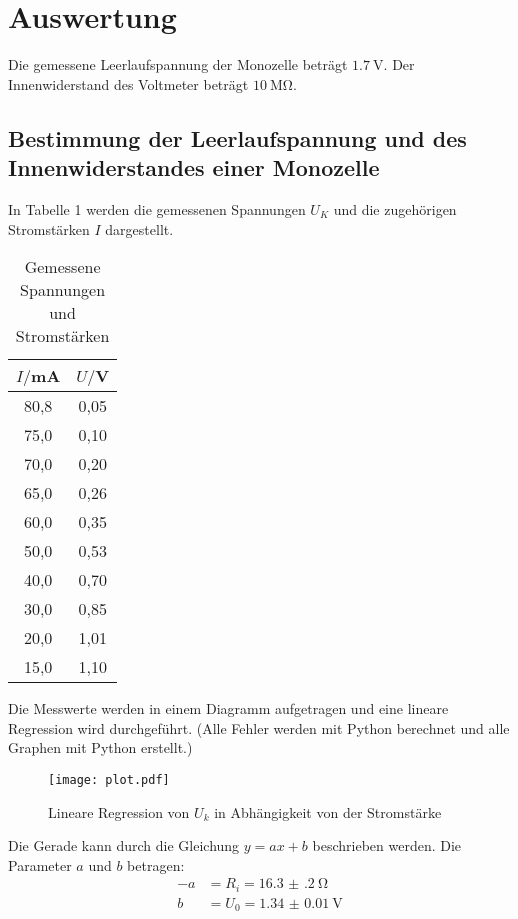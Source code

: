 \section{Auswertung}
\label{sec:Auswertung}

Die gemessene Leerlaufspannung der Monozelle beträgt $\SI{1.7}{\volt}$. Der Innenwiderstand des Voltmeter beträgt $\SI{10}{\mega\ohm}$.

\subsection{Bestimmung der Leerlaufspannung und des Innenwiderstandes einer Monozelle}

In Tabelle 1 werden die gemessenen Spannungen $U_K$ und die zugehörigen Stromstärken $I$ dargestellt.

\begin{table}[H]
  \centering
  \caption{Gemessene Spannungen und Stromstärken}
  \label{tab:spannung1}
  \begin{tabular}{c c}
    \toprule
    $I/$mA & $U/$V \\
    \midrule
    80,8  &  0,05 \\
    75,0  &  0,10 \\
    70,0  &  0,20 \\
    65,0  &  0,26 \\
    60,0  &  0,35 \\
    50,0  &  0,53 \\
    40,0  &  0,70 \\
    30,0  &  0,85 \\
    20,0  &  1,01 \\
    15,0  &  1,10 \\
    \bottomrule
  \end{tabular}
\end{table}

Die Messwerte werden in einem Diagramm aufgetragen und eine lineare Regression wird durchgeführt.
(Alle Fehler werden mit Python berechnet und alle Graphen mit Python erstellt.)

\begin{figure}[H]
  \centering
  \texttt{[image: plot.pdf]}
  \caption{Lineare Regression von $U_k$ in Abhängigkeit von der Stromstärke}
  \label{fig:plot}
\end{figure}

Die Gerade kann durch die Gleichung $y = ax + b$ beschrieben werden. Die Parameter $a$ und $b$ betragen:
\begin{align*}
  -a &= R_i = \SI{16.3(2)}{\ohm} \\
  b &= U_0 = \SI{1.34(1)}{\volt}
\end{align*}



